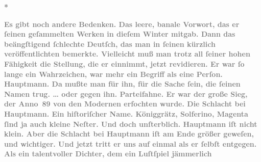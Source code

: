            
\pstart
           \centering{}\textcolor{gray}{\textbf{*}}\pend
           
\pstart
           \textcolor{gray}{\textbf{Es gibt noch andere Bedenken. Das leere, banale Vorwort, das er
                  ſeinen geſammelten Werken in dieſem Winter
                  mitgab. Dann das beängſtigend ſchlechte Deutſch, das man in ſeinen kürzlich
                  veröffentlichten \label{K_L03438-6v}\label{K_L03438-6} bemerkte.
                  Vielleicht muß man trotz all ſeiner hohen Fähigkeit die Stellung, die er einnimmt,
                  jetzt revidieren. Er war ſo lange ein Wahrzeichen, war mehr ein Begriff als eine
                  Perſon. Hauptmann. Da mußte man für ihn,
                  für die Sache ſein, die ſeinen Namen trug. \textsc{\label{K_L03438-7v}\label{K_L03438-7}}{ }{\dots} oder gegen ihn. Parteifahne. Er war der große Sieg,
                  der Anno 89 von den Modernen erfochten wurde. Die Schlacht bei Hauptmann. Ein hiſtoriſcher Name. Königgrätz, Solferino,
                     Magenta ſind ja auch kleine Neſter. Und
                  doch unſterblich. Hauptmann iſt nicht
                  klein. Aber die Schlacht bei Hauptmann iſt
                  am Ende größer geweſen, und wichtiger. Und jetzt tritt er uns auf einmal als er
                  ſelbſt entgegen. Als ein talentvoller Dichter, dem ein Luſtſpiel jämmerlich
}}
